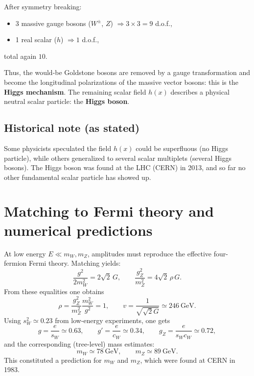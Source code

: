 After symmetry breaking:
\begin{itemize}
  \item 3 massive gauge bosons ($W^\pm$, $Z$) $\Rightarrow 3\times 3=9$ d.o.f.,
  \item 1 real scalar ($h$) $\Rightarrow 1$ d.o.f.,
\end{itemize}
total again $10$.

Thus, the would-be Goldstone bosons are removed by a gauge transformation and become the longitudinal polarizations of the massive vector bosons: this is the \textbf{Higgs mechanism}. The remaining scalar field $h(x)$ describes a physical neutral scalar particle: the \textbf{Higgs boson}.

\subsection{Historical note (as stated)}
Some physicists speculated the field $h(x)$ could be superfluous (no Higgs particle), while others generalized to several scalar multiplets (several Higgs bosons). The Higgs boson was found at the LHC (CERN) in 2013, and so far no other fundamental scalar particle has showed up.

\section{Matching to Fermi theory and numerical predictions}
At low energy $E\ll m_W,m_Z$, amplitudes must reproduce the effective four-fermion Fermi theory. Matching yields:
\begin{equation}
\boxed{
\frac{g^2}{2m_W^2}=2\sqrt{2}\,G,
\qquad
\frac{g_Z^2}{m_Z^2}=4\sqrt{2}\,\rho\,G.
}
\label{eq:matching}
\end{equation}
From these equalities one obtains
\begin{equation}
\boxed{
\rho=\frac{g_Z^2}{m_Z^2}\frac{m_W^2}{g^2}=1,
\qquad
v=\frac{1}{\sqrt{\sqrt{2}G}}\simeq 246~\mathrm{GeV}.
}
\label{eq:rho-v}
\end{equation}
Using $s_W^2\simeq 0.23$ from low-energy experiments, one gets
\begin{equation}
g=\frac{e}{s_W}\simeq 0.63,
\qquad
g'=\frac{e}{c_W}\simeq 0.34,
\qquad
g_Z=\frac{e}{s_Wc_W}\simeq 0.72,
\end{equation}
and the corresponding (tree-level) mass estimates:
\begin{equation}
m_W\simeq 78~\mathrm{GeV},
\qquad
m_Z\simeq 89~\mathrm{GeV}.
\end{equation}
This constituted a prediction for $m_W$ and $m_Z$, which were found at CERN in 1983.

